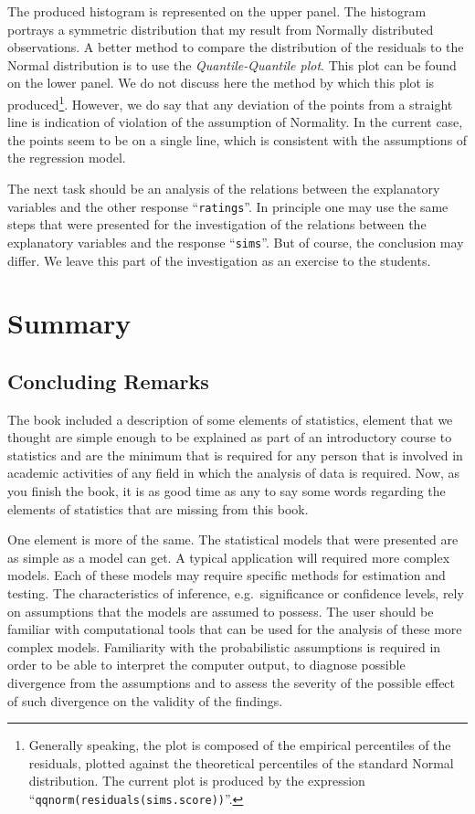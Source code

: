 \documentclass[
]{krantz}
\theoremstyle{definition}
\theoremstyle{definition}
\theoremstyle{definition}
\theoremstyle{remark}
\begin{document}
The produced histogram is represented on the upper panel. The histogram portrays a symmetric
distribution that my result from Normally distributed observations. A
better method to compare the distribution of the residuals to the Normal
distribution is to use the \emph{Quantile-Quantile plot}. This plot can be
found on the lower panel. We do not
discuss here the method by which this plot is produced\footnote{Generally speaking, the plot is composed of the empirical
  percentiles of the residuals, plotted against the theoretical
  percentiles of the standard Normal distribution. The current plot is
  produced by the expression ``\texttt{qqnorm(residuals(sims.score))}''.}. However, we
do say that any deviation of the points from a straight line is
indication of violation of the assumption of Normality. In the current
case, the points seem to be on a single line, which is consistent with
the assumptions of the regression model.

The next task should be an analysis of the relations between the
explanatory variables and the other response ``\texttt{ratings}''. In principle
one may use the same steps that were presented for the investigation of
the relations between the explanatory variables and the response
``\texttt{sims}''. But of course, the conclusion may differ. We leave this part
of the investigation as an exercise to the students.

\hypertarget{summary-13}{%
\section{Summary}\label{summary-13}}

\hypertarget{concluding-remarks}{%
\subsection{Concluding Remarks}\label{concluding-remarks}}

The book included a description of some elements of statistics, element
that we thought are simple enough to be explained as part of an
introductory course to statistics and are the minimum that is required
for any person that is involved in academic activities of any field in
which the analysis of data is required. Now, as you finish the book, it
is as good time as any to say some words regarding the elements of
statistics that are missing from this book.

One element is more of the same. The statistical models that were
presented are as simple as a model can get. A typical application will
required more complex models. Each of these models may require specific
methods for estimation and testing. The characteristics of inference,
e.g.~significance or confidence levels, rely on assumptions that the
models are assumed to possess. The user should be familiar with
computational tools that can be used for the analysis of these more
complex models. Familiarity with the probabilistic assumptions is
required in order to be able to interpret the computer output, to
diagnose possible divergence from the assumptions and to assess the
severity of the possible effect of such divergence on the validity of
the findings.
\end{document}
